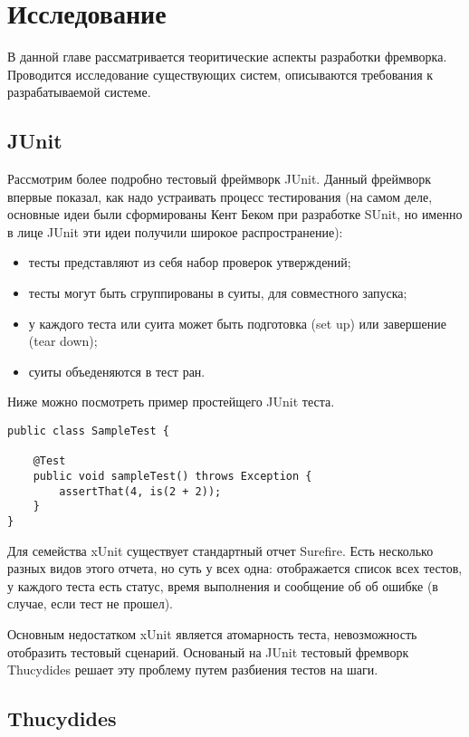 \chapter{Исследование}
\label{chapter2}

В данной главе рассматривается теоритические аспекты разработки фремворка. Проводится исследование существующих систем, описываются требования к разрабатываемой системе.

\section{JUnit}

Рассмотрим более подробно тестовый фреймворк JUnit. Данный фреймворк впервые показал, как надо устраивать процесс тестирования (на самом деле, основные идеи были сформированы Кент Беком при разработке SUnit, но именно в лице JUnit эти идеи получили широкое распространение):

\begin{itemize}
\item тесты представляют из себя набор проверок утверждений;
\item тесты могут быть сгруппированы в суиты, для совместного запуска;
\item у каждого теста или суита может быть подготовка (set up) или завершение (tear down);
\item суиты объеденяются в тест ран.
\end{itemize}

Ниже можно посмотреть пример простейщего JUnit теста.

\begin{lstlisting}[caption=Простой JUnit тест.]
public class SampleTest {

    @Test
    public void sampleTest() throws Exception {
        assertThat(4, is(2 + 2));
    }
}
\end{lstlisting}

Для семейства xUnit существует стандартный отчет Surefire. Есть несколько разных видов этого отчета, но суть у всех одна: отображается список всех тестов, у каждого теста есть статус, время выполнения и сообщение об об ошибке (в случае, если тест не прошел). 

Основным недостатком xUnit является атомарность теста, невозможность отобразить тестовый сценарий. Основаный на JUnit тестовый фремворк Thucydides решает эту проблему путем разбиения тестов на шаги.

\section{Thucydides}

